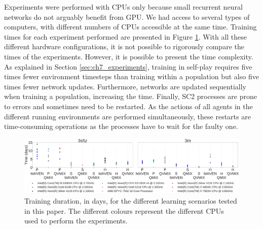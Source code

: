 Experiments were performed with CPUs only because small recurrent neural networks do not arguably benefit from GPU.
We had access to several types of computers, with different numbers of CPUs accessible at the same time.
Training times for each experiment performed are presented in Figure \ref{fig:training_time}.
With all these different hardware configurations, it is not possible to rigorously compare the times of the experiments.
However, it is possible to present the time complexity.
As explained in Section \ref{sec:ch7_experiments}, training in self-play requires five times fewer environment timesteps than training within a population but also five times fewer network updates.
Furthermore, networks are updated sequentially when training a population, increasing the time.
Finally, SC2 processes are prone to errors and sometimes need to be restarted.
As the actions of all agents in the different running environments are performed simultaneously, these restarts are time-consuming operations as the processes have to wait for the faulty one.


\begin{figure}
    \centering
    \includegraphics[width=\textwidth]{tex_thesis/figures/ch7/training_time.pdf}
    \caption{Training duration, in days, for the different learning scenarios tested in this paper.
    The different colours represent the different CPUs used to perform the experiments.}
    \label{fig:training_time}
\end{figure}
